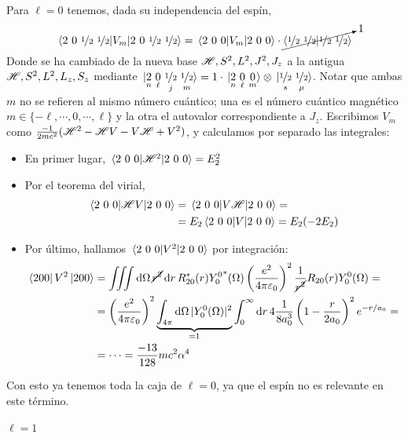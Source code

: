 Para $\ell=0$ tenemos, dada su independencia del espín,
\begin{equation}
  \ev{V_m}{2\ 0 \ \oh\ \oh} = \ev{V_m}{2\ 0 \ 0} \cdot \cancelto{1}{\ip{\oh\ \oh}}
\end{equation}
Donde se ha cambiado de la nueva base $ \mathscr{H} ,S^2,L^2,J^2,J_z$ a
la antigua $ \mathscr{H} ,S^2,L^2,L_z,S_z$  mediante
$\ket*{\underset{n}{2} \ \underset{\ell}{0} \ \underset{j}{\oh}\  \underset{m}{\oh}} = 1 \cdot
\ket*{\underset{n}{2} \ \underset{\ell}{0}\ 
  \underset{m}{0}}\otimes\ket*{\underset{s}{\oh} \
  \underset{\mu}{\oh}}$. Notar que ambas $m$ no se refieren al mismo
número cuántico; una es el número cuántico magnético
$m\in\{-\ell,\cdots,0,\cdots,\ell\}$ y la otra el autovalor correspondiente
a $J_z$.
Escribimos $V_m$ como $\frac{-1}{2mc^2} ( \mathscr{H} ^2 -  \mathscr{H} V
- V  \mathscr{H}  + V^2)$, y calculamos por separado las integrales:
\begin{itemize}
\item En primer lugar, $\ev{ \Ham ^2}{2\ 0\ 0} = E_2^2$
\item Por el teorema del virial, 
  \begin{equation}
    \begin{split}
      \ev{ \Ham V}{2\ 0 \ 0} &= \ev{V \Ham }{2\ 0 \ 0} =\\&=
      E_2\ev{V}{2\ 0 \ 0} = E_2(-2E_2)
    \end{split}
  \end{equation}
\item Por último, hallamos $\ev{V^2}{2\ 0\ 0}$ por integración:
\begin{equation}
  \begin{split}
    \bra{200}V^2\ket{200} &= \int\!\!\!\int\!\!\!\int \dd{\Omega} \cancel{r^2} \dd{r}
    R_{20}^*(r){Y_0^0}^*(\Omega) \left( \frac{e^2}{4\pi\varepsilon_0}
    \right)^2 \frac{1}{\cancel{r^2}} R_{20}(r)Y_0^0(\Omega) = \\
    &= \left( \frac{e^2}{4\pi\varepsilon_0} \right)^2
    \underbrace{\int_{4\pi} \dd{\Omega}|Y_0^0(\Omega)|^2}_{=1}
    \int_0^\infty \dd{r} 4 \frac{1}{8a_0^3} \left( 1- \frac{r}{2a_0}
    \right)^2 e^{-r/a_0} = \\
    &= \cdots =  \frac{-13}{128} m c^2 \alpha^4
  \end{split}
\end{equation}

\end{itemize}

Con esto ya tenemos toda la caja de $\ell=0$, ya que el espín no es
relevante en este término. 
\paragraph{$\ell=1$}

